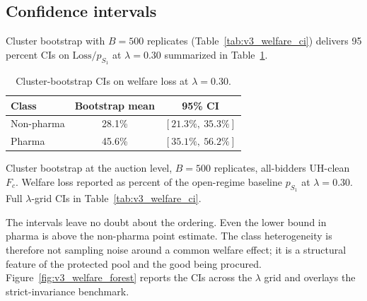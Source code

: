 \subsection{Confidence intervals}

Cluster bootstrap with $B=500$ replicates (Table~\ref{tab:v3_welfare_ci}) delivers 95 percent CIs on $\mathrm{Loss}/p_{S_1}$ at $\lambda = 0.30$ summarized in Table~\ref{tab:welfare_ci_summary}.

\begin{table}[!htbp]
\centering
\begin{threeparttable}
\caption{Cluster-bootstrap CIs on welfare loss at $\lambda = 0.30$.}
\label{tab:welfare_ci_summary}
\small
\setlength{\tabcolsep}{6pt}
\begin{tabular}{lcc}
\toprule
Class      & Bootstrap mean  & 95\% CI \\
\midrule
Non-pharma & 28.1\% & $[21.3\%,\ 35.3\%]$ \\
Pharma     & 45.6\% & $[35.1\%,\ 56.2\%]$ \\
\bottomrule
\end{tabular}
\begin{tablenotes}\footnotesize
\item Cluster bootstrap at the auction level, $B = 500$ replicates, all-bidders UH-clean $F_c$. Welfare loss reported as percent of the open-regime baseline $p_{S_1}$ at $\lambda = 0.30$. Full $\lambda$-grid CIs in Table~\ref{tab:v3_welfare_ci}.
\end{tablenotes}
\end{threeparttable}
\end{table}

The intervals leave no doubt about the ordering. Even the lower bound in pharma is above the non-pharma point estimate. The class heterogeneity is therefore not sampling noise around a common welfare effect; it is a structural feature of the protected pool and the good being procured. Figure~\ref{fig:v3_welfare_forest} reports the CIs across the $\lambda$ grid and overlays the strict-invariance benchmark.

